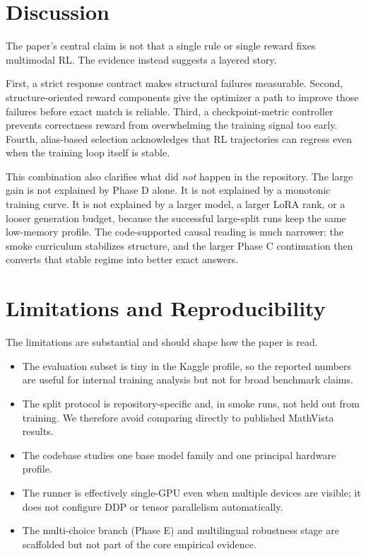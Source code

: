 \documentclass{article} %
\begin{document}
\section{Discussion}

The paper's central claim is not that a single rule or single reward fixes multimodal RL. The evidence instead suggests a layered story.

First, a strict response contract makes structural failures measurable. Second, structure-oriented reward components give the optimizer a path to improve those failures before exact match is reliable. Third, a checkpoint-metric controller prevents correctness reward from overwhelming the training signal too early. Fourth, alias-based selection acknowledges that RL trajectories can regress even when the training loop itself is stable.

This combination also clarifies what did \emph{not} happen in the repository. The large gain is not explained by Phase D alone. It is not explained by a monotonic training curve. It is not explained by a larger model, a larger LoRA rank, or a looser generation budget, because the successful large-split runs keep the same low-memory profile. The code-supported causal reading is much narrower: the smoke curriculum stabilizes structure, and the larger Phase C continuation then converts that stable regime into better exact answers.

\section{Limitations and Reproducibility}

The limitations are substantial and should shape how the paper is read.

\begin{itemize}[leftmargin=1.2em]
\item The evaluation subset is tiny in the Kaggle profile, so the reported numbers are useful for internal training analysis but not for broad benchmark claims.
\item The split protocol is repository-specific and, in smoke runs, not held out from training. We therefore avoid comparing directly to published MathVista results.
\item The codebase studies one base model family and one principal hardware profile.
\item The runner is effectively single-GPU even when multiple devices are visible; it does not configure DDP or tensor parallelism automatically.
\item The multi-choice branch (Phase E) and multilingual robustness stage are scaffolded but not part of the core empirical evidence.
\end{itemize}
\end{document}
